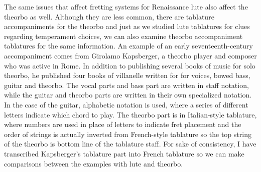 The same issues that affect fretting systems for Renaissance lute also affect the
theorbo as well.  Although they are less common, there are tablature accompaniments for
the theorbo and just as we studied lute tablatures for clues regarding temperament
choices, we can also examine theorbo accompaniment tablatures for the same information.
An example of an early seventeenth-century accompaniment comes from Girolamo
Kapsberger, a theorbo player and composer who was active in Rome. In addition to
publishing several books of music for solo theorbo, he published four books of
villanelle written for for voices, bowed bass, guitar and theorbo.  The vocal parts and
bass part are written in staff notation, while the guitar and theorbo parts are written
in their own specialized notation.  In the case of the guitar, alphabetic notation is
used, where a series of different letters indicate which chord to play. The theorbo
part is in Italian-style tablature, where numbers are used in place of letters to
indicate fret placement and the order of strings is actually inverted from French-style
tablature so the top string of the theorbo is bottom line of the tablature staff.  For
sake of consistency, I have transcribed Kapsberger's tablature part into French
tablature so we can make comparisons between the examples with lute and theorbo.

